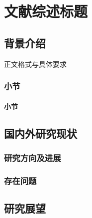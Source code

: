 \newrefsection

\chapter{
    \heiti\setlength{\parskip}{2em} 文献综述标题
}




\section{背景介绍}
\par 正文格式与具体要求\cite{zjuthesisrules}

\subsection{小节}

\subsubsection{小节}

\section{国内外研究现状}

\subsection{研究方向及进展}

\subsection{存在问题}

\section{研究展望}

\newpage
\begingroup
    \printbibliography[title={参考文献}]
\endgroup
